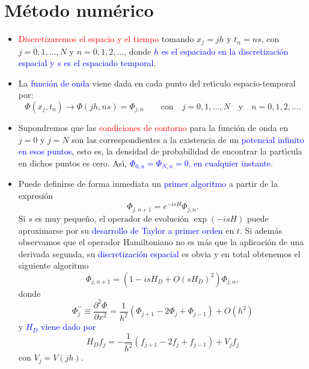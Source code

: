\documentclass[12pt]{iopart}
\def\az{\textcolor{blue}}
\def\ro{\textcolor{red}}
\begin{document}
\section{M{\'e}todo num{\'e}rico}

\begin{itemize}

\item \ro{Discretizaremos el espacio y el tiempo} tomando
$x_j=jh$ y $t_n=ns$, con $j=0,1,...,N$ y  $n=0,1,2,...$,
donde  \az{$h$ es el espaciado en la discretizaci\'on espacial y $s$ es el
espaciado temporal}. 

\item La \az{funci\'on de onda} viene dada en cada punto del
ret\'{\i}culo espacio-temporal por:
\begin{equation}
\Phi(x_j,t_n)\rightarrow\Phi(jh,ns)=\Phi_{j,n}\quad\quad \text{con}\quad
j=0,1,...,N \quad \text{y} \quad  n=0,1,2,... .
\end{equation}

\item Supondremos que las \ro{condiciones de contorno} para la funci{\'o}n de onda en $j=0$ y $j=N$ son las correspondientes
a la existencia de un \az{potencial infinito en esos puntos}, esto es, la densidad
de  probabilidad de encontrar la part{\'\i}cula en dichos puntos es cero.
As\'{\i}, \az{$\Phi_{0,n}=\Phi_{N,n}=0$, en cualquier instante}. 

\item Puede definirse de forma inmediata un \az{primer algoritmo} a partir de la expresi{\'o}n 
%
\begin{equation}
\Phi_{j,n+1}= e^{-i s H}\Phi_{j,n}.
\end{equation}
%
Si $s$ es muy peque{\~n}o, el operador de evoluci{\'o}n $\exp{(-isH)}$ 
puede aproximarse por su \az{desarrollo de Taylor a primer orden} en $t$. Si adem{\'a}s observamos
que el operador Hamiltoniano no es m{\'a}s que la aplicaci{\'o}n de una derivada segunda, su \az{discretizaci{\'o}n espacial} es
obvia y en total obtenemos el siguiente algoritmo
%
\begin{equation}
\Phi_{j,n+1}=\left(1-isH_D+O(sH_D)^2\right)\Phi_{j,n},
\end{equation}
%
donde 
%
\begin{equation}
\Phi_j^{\prime\prime}\equiv \frac{\partial^2 \Phi}{\partial x^2}=\frac{1}{h^2}(\Phi_{j+1}-2\Phi_j+\Phi_{j-1})+O(h^2)
\end{equation}
%
y \az{$H_D$ viene dado por}
%
\begin{equation}
H_D f_j=- \frac{1}{h^2}(f_{j+1}-2f_j+f_{j-1})+V_jf_j
\end{equation}
%
con $V_j=V(jh)$. 


\end{itemize}
\end{document}
